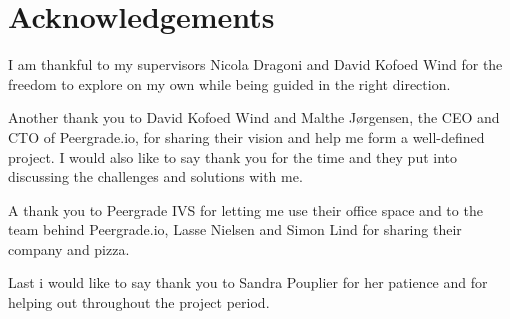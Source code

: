 \chapter{Acknowledgements}

I am thankful to my supervisors Nicola Dragoni and David Kofoed Wind for the freedom to explore on my own while being guided in the right direction.

Another thank you to David Kofoed Wind and Malthe Jørgensen, the CEO and CTO of Peergrade.io, for sharing their vision and help me form a well-defined project. I would also like to say thank you for the time and they put into discussing the challenges and solutions with me.

A thank you to Peergrade IVS for letting me use their office space and to the team behind Peergrade.io, Lasse Nielsen and Simon Lind for sharing their company and pizza.

Last i would like to say thank you to Sandra Pouplier for her patience and for helping out throughout the project period.
